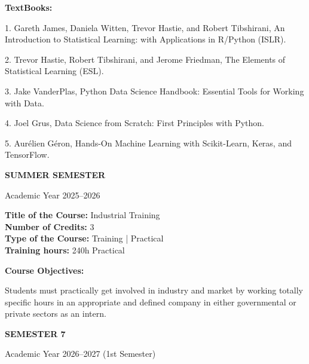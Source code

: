 \documentclass[12pt,a4paper]{article}
\begin{document}
\textbf{TextBooks:}\par\vspace{2pt}
1. Gareth James, Daniela Witten, Trevor Hastie, and Robert Tibshirani, An Introduction to Statistical Learning: with Applications in R/Python (ISLR).\par
2. Trevor Hastie, Robert Tibshirani, and Jerome Friedman, The Elements of Statistical Learning (ESL).\par
3. Jake VanderPlas, Python Data Science Handbook: Essential Tools for Working with Data.\par
4. Joel Grus, Data Science from Scratch: First Principles with Python.\par
5. Aurélien Géron, Hands-On Machine Learning with Scikit-Learn, Keras, and TensorFlow.\par
\vspace{4pt}

\newpage
\vspace*{\fill}
\begin{center}
  {\fontsize{28pt}{34pt}\selectfont \textbf{SUMMER SEMESTER}}\par\vspace{12pt}
  {\fontsize{13pt}{17pt}\selectfont Academic Year 2025–2026}
\end{center}
\vspace*{\fill}

\newpage
\nopagebreak
\textbf{Title of the Course:} Industrial Training\\
\textbf{Number of Credits:} 3\\
\textbf{Type of the Course:} Training | Practical\\
\textbf{Training hours:} 240h Practical\par\vspace{4pt}
\textbf{Course Objectives:}\par\vspace{2pt}
Students must practically get involved in industry and market by working totally specific hours in
an appropriate and defined company in either governmental or private sectors as an intern.\par\vspace{4pt}

\newpage
\vspace*{\fill}
\begin{center}
  {\fontsize{28pt}{34pt}\selectfont \textbf{SEMESTER 7}}\par\vspace{12pt}
  {\fontsize{13pt}{17pt}\selectfont Academic Year 2026–2027 (1st Semester)}
\end{center}
\vspace*{\fill}
\end{document}

